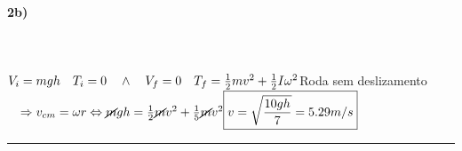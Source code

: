 \paragraph{2b)} ~\\
\\
$
V_{i}=mgh \quad T_i=0 \quad \wedge \quad V_f=0 \quad T_f=\frac{1}{2}mv^2+\frac{1}{2}I\omega^2\\
$Roda sem deslizamento$\quad \Rightarrow v_{cm}=\omega r\\
\\
\Leftrightarrow \cancel{m}gh=\frac{1}{2}\cancel{m}v^2+\frac{1}{5}\cancel{m}v^2\\
\\
\boxed{v=\sqrt{\frac{10gh}{7}}=5.29m/s}\\
$
%
\\
\hrule
 \pagebreak
